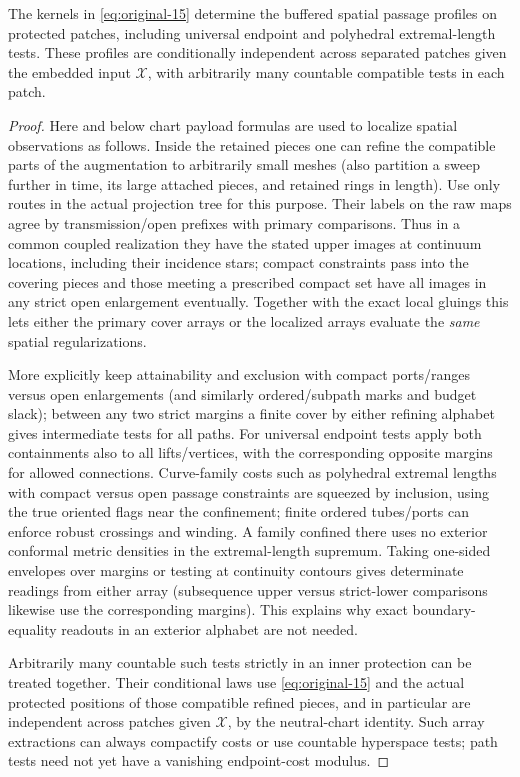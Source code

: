 \begin{lemma}\label{kern:spatial-readouts}
The kernels in \eqref{eq:original-15} determine the buffered spatial passage profiles on
protected patches, including universal endpoint and polyhedral extremal-length tests. These
profiles are conditionally independent across separated patches given the embedded
input $\mathcal X$, with
arbitrarily many countable compatible tests in each patch.
\end{lemma}
\begin{proof}

Here and below chart payload formulas are used to localize spatial observations as follows. Inside the
retained pieces one can refine the compatible parts of the augmentation to arbitrarily small meshes (also
partition a sweep further in time, its large attached pieces, and retained rings in length). Use only routes
in the actual projection tree for this purpose. Their labels on the raw maps agree by transmission/open
prefixes with primary comparisons. Thus in a common coupled realization they have the stated upper images at
continuum locations, including their incidence stars; compact constraints pass into the covering pieces and
those meeting a prescribed compact set have all images in any strict open enlargement eventually. Together
with the exact local gluings this lets either the primary cover arrays or the localized arrays evaluate the
\emph{same} spatial regularizations.

More explicitly keep attainability and exclusion with compact
ports/ranges versus open enlargements (and similarly ordered/subpath marks and budget slack); between any
two strict margins a finite cover by either refining alphabet gives intermediate tests for all paths. For
universal endpoint tests apply both containments also to all lifts/vertices, with the corresponding opposite
margins for allowed connections. Curve-family costs such as polyhedral extremal lengths with compact versus
open passage constraints are squeezed by inclusion, using the true oriented flags near the confinement;
finite ordered tubes/ports can enforce robust crossings and winding. A family confined there uses no
exterior conformal metric densities in the extremal-length supremum. Taking one-sided envelopes over margins
or testing at continuity contours gives determinate readings from either array (subsequence upper versus
strict-lower comparisons likewise use the corresponding margins). This explains why exact boundary-equality
readouts in an exterior alphabet are not needed.

Arbitrarily many countable such tests strictly in an inner
protection can be treated together. Their conditional laws use \eqref{eq:original-15} and the actual
protected positions of those compatible refined pieces, and in particular are independent across patches
given $\mathcal X$, by the neutral-chart identity. Such array extractions can always compactify costs or use countable hyperspace tests;
path tests need not yet have a vanishing endpoint-cost modulus.

\end{proof}

